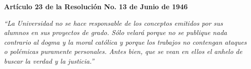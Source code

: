 \newpage
\thispagestyle{empty}
\noindent \textbf{Artículo 23 de la Resolución No. 13 de Junio de 1946}\\

\vspace{0.25cm}

\noindent \textit{``La Universidad no se hace responsable de los conceptos emitidos por sus alumnos en sus
proyectos de grado. Sólo velará porque no se publique nada contrario al dogma y la moral católica y porque
los trabajos no contengan ataques o polémicas puramente personales. Antes bien, que se vean en ellos el
anhelo de buscar la verdad y la justicia.''}
\newpage
